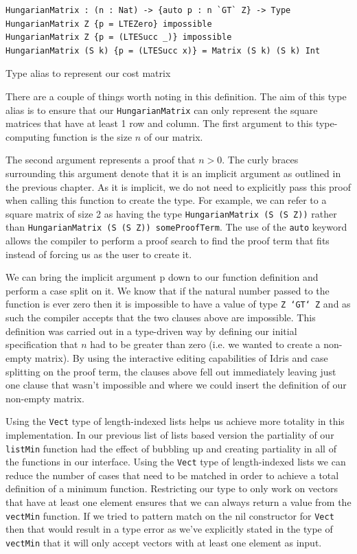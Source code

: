 \documentclass[a4paper, notitlepage]{report}
\begin{document}
\begin{listing}[H]
\begin{verbatim}
HungarianMatrix : (n : Nat) -> {auto p : n `GT` Z} -> Type
HungarianMatrix Z {p = LTEZero} impossible
HungarianMatrix Z {p = (LTESucc _)} impossible
HungarianMatrix (S k) {p = (LTESucc x)} = Matrix (S k) (S k) Int
\end{verbatim}
\caption{Type alias to represent our cost matrix}
\end{listing}

There are a couple of things worth noting in this definition. The aim of this
type alias is to ensure that our \texttt{HungarianMatrix} can only represent the square
matrices that have at least 1 row and column. The first argument to this
type-computing function is the size \(n\) of our matrix.

The second argument represents a proof that \(n > 0\). The curly braces
surrounding this argument denote that it is an implicit argument as outlined in
the previous chapter. As it is implicit, we do not need to explicitly pass this
proof when calling this function to create the type. For example, we can refer
to a square matrix of size 2 as having the type \texttt{HungarianMatrix (S (S Z))}
rather than \texttt{HungarianMatrix (S (S Z)) someProofTerm}. The use of the \texttt{auto}
keyword allows the compiler to perform a proof search to find the proof term
that fits instead of forcing us as the user to create it.

We can bring the implicit argument p down to our function definition and perform
a case split on it. We know that if the natural number passed to the function is
ever zero then it is impossible to have a value of type \texttt{Z `GT` Z} and as such
the compiler accepts that the two clauses above are impossible. This definition
was carried out in a type-driven way by defining our initial specification that
\(n\) had to be greater than zero (i.e. we wanted to create a non-empty matrix).
By using the interactive editing capabilities of Idris and case splitting on the
proof term, the clauses above fell out immediately leaving just one clause that
wasn't impossible and where we could insert the definition of our non-empty
matrix.

Using the \texttt{Vect} type of length-indexed lists helps us achieve more totality in
this implementation. In our previous list of lists based version the partiality
of our \texttt{listMin} function had the effect of bubbling up and creating partiality in
all of the functions in our interface. Using the \texttt{Vect} type of length-indexed
lists we can reduce the number of cases that need to be matched in order to
achieve a total definition of a minimum function. Restricting our type to only
work on vectors that have at least one element ensures that we can always return
a value from the \texttt{vectMin} function. If we tried to pattern match on the nil
constructor for \texttt{Vect} then that would result in a type error as we've explicitly
stated in the type of \texttt{vectMin} that it will only accept vectors with at least one
element as input.
\end{document}
